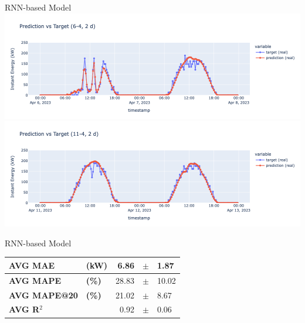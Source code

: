 \begin{frame}{RNN-based Model}
    \centering
    \includegraphics[width=\textwidth]{sections/5_eval/imgs/rnn/grrun2dbuco2.png}
    \includegraphics[width=\textwidth]{sections/5_eval/imgs/rnn/rnnbuo1.png}
   \end{frame} 
   
\begin{frame}{RNN-based Model}
    \begin{table}[]
        \centering
        \begin{tabular}{ll|rcl}
            \textbf{AVG MAE} &\textbf{(kW)} & 6.86 &$\pm$ &1.87\\
            \hline
            \textbf{AVG MAPE} &\textbf{(\%)} & 28.83 &$\pm$ &10.02 \\
            \hline
            \textbf{AVG MAPE@20}&\textbf{(\%)} & 21.02 &$\pm$ &8.67 \\
            \hline
            \textbf{AVG R$^2$}& & 0.92 &$\pm$ &0.06
            
        \end{tabular}
    \end{table}
\end{frame}

